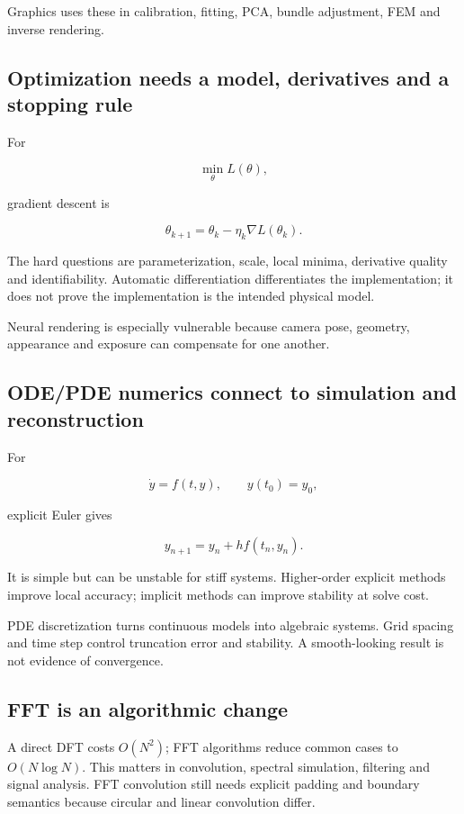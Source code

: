 Graphics uses these in calibration, fitting, PCA, bundle adjustment, FEM and inverse rendering.

\subsection{Optimization needs a model, derivatives and a stopping rule}\label{optimization-needs-a-model-derivatives-and-a-stopping-rule}

For

\[
\min_\theta L(\theta),
\]

gradient descent is

\[
\theta_{k+1}=\theta_k-\eta_k\nabla L(\theta_k).
\]

The hard questions are parameterization, scale, local minima, derivative quality and identifiability. Automatic differentiation differentiates the implementation; it does not prove the implementation is the intended physical model.

Neural rendering is especially vulnerable because camera pose, geometry, appearance and exposure can compensate for one another.

\subsection{ODE/PDE numerics connect to simulation and reconstruction}\label{odepde-numerics-connect-to-simulation-and-reconstruction}

For

\[
\dot y=f(t,y),\qquad y(t_0)=y_0,
\]

explicit Euler gives

\[
y_{n+1}=y_n+h f(t_n,y_n).
\]

It is simple but can be unstable for stiff systems. Higher-order explicit methods improve local accuracy; implicit methods can improve stability at solve cost.

PDE discretization turns continuous models into algebraic systems. Grid spacing and time step control truncation error and stability. A smooth-looking result is not evidence of convergence.

\subsection{FFT is an algorithmic change}\label{fft-is-an-algorithmic-change}

A direct DFT costs \(O(N^2)\); FFT algorithms reduce common cases to \(O(N\log N)\). This matters in convolution, spectral simulation, filtering and signal analysis. FFT convolution still needs explicit padding and boundary semantics because circular and linear convolution differ.

